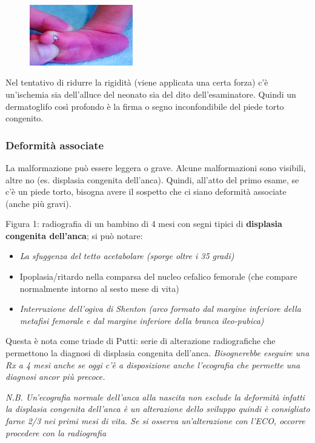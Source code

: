 \begin{figure}[!ht]
\centering
\includegraphics[width=0.4\textwidth]{016/image2.png}
\end{figure}

Nel tentativo di ridurre la rigidità (viene applicata una certa forza) c'è un'ischemia sia dell'alluce del neonato sia del dito dell'esaminatore. Quindi un dermatoglifo così profondo è la firma o segno inconfondibile del piede torto congenito.

\subsubsection{Deformità associate}

La malformazione può essere leggera o grave. Alcune malformazioni sono visibili, altre no (es. displasia congenita dell'anca). Quindi, all'atto del primo esame, se c'è un piede torto, bisogna avere il sospetto che ci siano deformità associate (anche più gravi).

Figura 1: radiografia di un bambino di 4 mesi con segni tipici di \textbf{displasia congenita dell'anca}; si può notare:

\begin{itemize}
\item
  \emph{La sfuggenza del tetto acetabolare (sporge oltre i 35 gradi)}
\item
  Ipoplasia/ritardo nella comparsa del nucleo cefalico femorale (che compare normalmente intorno al sesto mese di vita)
\item
  \emph{Interruzione dell'ogiva di Shenton (arco formato dal margine inferiore della metafisi femorale e dal margine inferiore della branca ileo-pubica)}
\end{itemize}

Questa è nota come triade di Putti: serie di alterazione radiografiche che permettono la diagnosi di displasia congenita dell'anca.
\emph{Bisognerebbe eseguire una Rx a 4 mesi anche se oggi c'è a disposizione anche l'ecografia che permette una diagnosi ancor più precoce.}

\emph{N.B. Un'ecografia normale dell'anca alla nascita non esclude la deformità infatti la displasia congenita dell'anca è un alterazione dello sviluppo quindi è consigliato farne 2/3 nei primi mesi di vita. Se si osserva un'alterazione con l'ECO, occorre procedere con la
radiografia}

